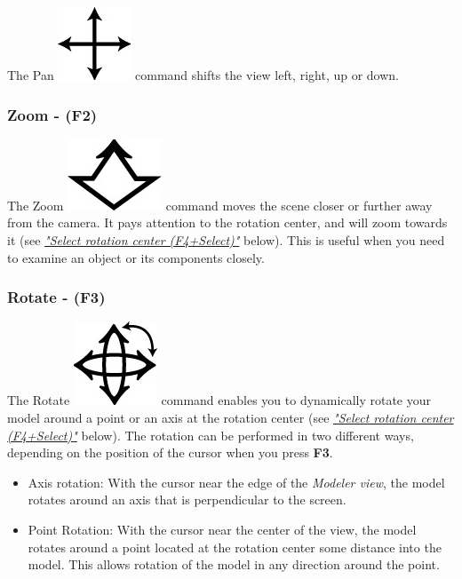 The Pan \includegraphics[scale=0.7]{Figures/pan} command shifts the view left,
right, up or down.

\subsubsection{Zoom - (F2)}

The Zoom \includegraphics[scale=0.7]{Figures/zoom} command moves the scene
closer or further away from the camera.
It pays attention to the rotation center, and will zoom towards it
(see \protect\hyperlink{select-rotation-center}{\sl"Select rotation center (F4+Select)"} below).
This is useful when you need to examine an object or its components closely.


\subsubsection{Rotate - (F3)}

The Rotate \includegraphics[scale=0.7]{Figures/rotate} command enables you to
dynamically rotate your model around a point or an axis at the rotation center
(see \protect\hyperlink{select-rotation-center}{\sl"Select rotation center (F4+Select)"} below).
The rotation can be performed in two different ways, depending on the position
of the cursor when you press \textbf{F3}.

\begin{itemize}
\item Axis rotation: With the cursor near the edge of the {\sl Modeler view},
  the model rotates around an axis that is perpendicular to the screen.
\item Point Rotation: With the cursor near the center of the view,
  the model rotates around a point located at the rotation center
  some distance into the model. This allows rotation of the model
  in any direction around the point.
\end{itemize}

